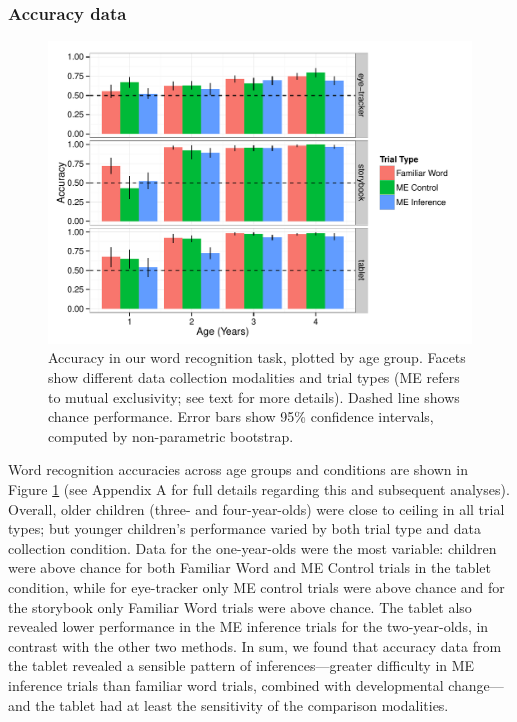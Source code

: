 \documentclass[man,noapacite]{apa2}
\begin{document}
\subsubsection{Accuracy data} 

\begin{figure}[t] 
  \begin{center} 
    \includegraphics[width=5in]{figures/accuracy.pdf} 
    \caption{\label{fig:accuracy} Accuracy in our word recognition task, plotted by age group. Facets show different data collection modalities and trial types (ME refers to mutual exclusivity; see text for more details). Dashed line shows chance performance. Error bars show 95\% confidence intervals, computed by non-parametric bootstrap. }
  \end{center} 
\end{figure}

Word recognition accuracies across age groups and conditions are shown in Figure \ref{fig:accuracy} (see Appendix A for full details regarding this and subsequent analyses). Overall, older children (three- and four-year-olds) were close to ceiling in all trial types; but younger children's performance varied by both trial type and data collection condition. Data for the one-year-olds were the most variable: children were above chance for both Familiar Word and ME Control trials in the tablet condition, while for eye-tracker only ME control trials were above chance and for the storybook only Familiar Word trials were above chance. The tablet also revealed lower performance in the ME inference trials for the two-year-olds, in contrast with the other two methods. In sum, we found that accuracy data from the tablet revealed a sensible pattern of inferences---greater difficulty in ME inference trials than familiar word trials, combined with developmental change---and the tablet had at least the sensitivity of the comparison modalities. 
\end{document}
